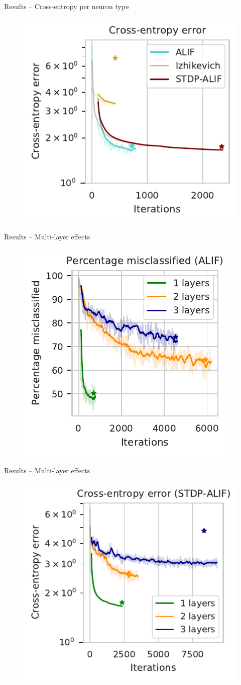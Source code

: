 \documentclass[t]{beamer}
\begin{document}
\begin{frame}{Results -- Cross-entropy per neuron type}
  \begin{figure}[!ht]
    \centering
    \includegraphics[width=0.6\linewidth]{crossentropy}
  \end{figure}
\end{frame}

\begin{frame}{Results -- Multi-layer effects}
  \begin{figure}[!ht]
    \centering
    \includegraphics[width=0.6\linewidth]{ml-percwrong-ALIF}
  \end{figure}
\end{frame}

\begin{frame}{Results -- Multi-layer effects}
  \begin{figure}[!ht]
    \centering
    \includegraphics[width=0.6\linewidth]{ml-crossentropy-STDP-ALIF}
  \end{figure}
\end{frame}
\end{document}
